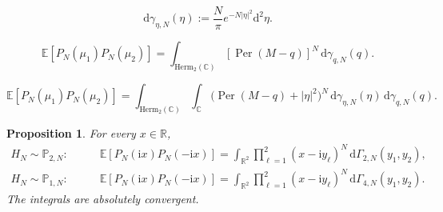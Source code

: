 \documentclass[10pt,a4paper]{amsart}
\newtheorem{proposition}{Proposition}
\newcommand{\C}{\mathbb C}
\newcommand{\E}{\mathbb E}
\newcommand{\Herm}{\mathrm{Herm}}
\DeclareMathOperator{\Per}{Per}
\newcommand{\Pp}{\mathbb P}
\newcommand{\R}{\mathbb R}
\newcommand{\dd}{\mathrm d}
\newcommand{\ii}{\mathrm i}
\begin{document}
\begin{equation}\label{eq:eta-law}
  \dd\gamma_{\eta,N}(\eta)
  :=
  \frac N\pi e^{-N|\eta|^2}\dd^2\eta.
\end{equation}

\begin{equation}\label{eq:GUE-per-duality}
  \E[P_N(\mu_1)P_N(\mu_2)]
  =
  \int_{\Herm_2(\C)}
  [\Per(M-q)]^N\,\dd\gamma_{q,N}(q).
\end{equation}

\begin{equation}\label{eq:GOE-per-duality}
  \E[P_N(\mu_1)P_N(\mu_2)]
  =
  \int_{\Herm_2(\C)}\int_{\C}
  \bigl(\Per(M-q)+|\eta|^2\bigr)^N
  \,\dd\gamma_{\eta,N}(\eta)\,\dd\gamma_{q,N}(q).
\end{equation}

\begin{proposition}\label{prop:scalar-permanent-duality}
For every \(x\in\R\),
\begin{align}
  H_N\sim\Pp_{2,N}:\qquad
  &\E[P_N(\ii x)P_N(-\ii x)]
  =
  \int_{\R^2}
  \prod_{\ell=1}^2(x-\ii y_\ell)^N
  \,\dd\Gamma_{2,N}(y_1,y_2),
  \label{eq:GUE-per-scalar}\\
  H_N\sim\Pp_{1,N}:\qquad
  &\E[P_N(\ii x)P_N(-\ii x)]
  =
  \int_{\R^2}
  \prod_{\ell=1}^2(x-\ii y_\ell)^N
  \,\dd\Gamma_{4,N}(y_1,y_2).
  \label{eq:GOE-per-scalar}
\end{align}
The integrals are absolutely convergent.
\end{proposition}
\end{document}

